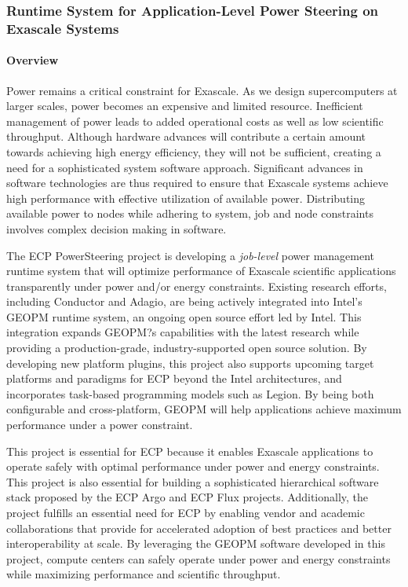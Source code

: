 \subsubsection{Runtime System for Application-Level Power Steering on Exascale Systems} 

\paragraph{Overview} 
Power remains a critical constraint for Exascale. As we design supercomputers at larger scales, power becomes an expensive and limited resource. Inefficient management of power leads to added operational costs as well as low scientific throughput. Although hardware advances will contribute a certain amount towards achieving high energy efficiency, they will not be sufficient, creating a need for a sophisticated system software approach. Significant advances in software technologies are thus required to ensure that Exascale systems achieve high performance with effective utilization of available power. Distributing available power to nodes while adhering to system, job and node constraints involves complex decision making in software. 

The ECP PowerSteering project is developing a \emph{job-level} power management runtime system that will optimize performance of Exascale scientific applications transparently under power and/or energy constraints. Existing research efforts, including Conductor and Adagio, are being actively integrated into Intel's GEOPM runtime system, an ongoing open source effort led by Intel. This integration expands GEOPM?s capabilities with the latest research while providing a production-grade, industry-supported open source solution. By developing new platform plugins, this project also supports upcoming target platforms and paradigms for ECP beyond the Intel architectures, and incorporates task-based programming models such as Legion. By being both configurable and cross-platform, GEOPM will help applications achieve maximum performance under a power constraint. 

This project is essential for ECP because it enables Exascale applications to operate safely with optimal performance under power and energy constraints. This project is also essential for building a sophisticated hierarchical software stack proposed by the ECP Argo and ECP Flux projects. Additionally, the project fulfills an essential need for ECP by enabling vendor and academic collaborations that provide for accelerated adoption of best practices and better interoperability at scale.  By leveraging the GEOPM software developed in this project, compute centers can safely operate under power and energy constraints while maximizing performance and scientific throughput. 


